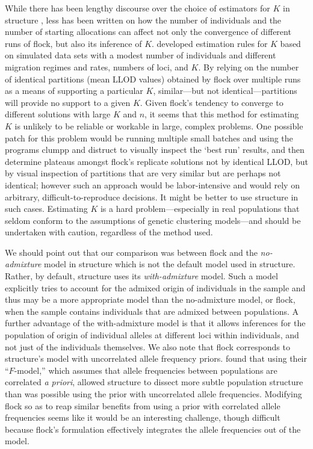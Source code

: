 While there has been lengthy 
discourse over the choice of estimators for $K$ in {\sc structure} 
\citep{Pritchardetal2000,Evannoetal2005,Wap&Gag2006,Gaoetal2011}, less has been written on how the number of 
individuals
and the number of starting allocations can affect not only the convergence of different runs of {\sc flock}, but also its 
inference of $K$. \citeauthor{Duc&Tur2012} developed estimation rules for $K$ based on simulated data 
sets with a modest number of individuals and different migration regimes and rates, numbers of loci, and $K$. 
By relying on the number of identical partitions (mean LLOD values) obtained by {\sc flock} over multiple
runs as a means of supporting 
a particular $K$,  similar---but not identical---partitions
will provide no support to a given $K$. Given {\sc flock}'s tendency to converge to 
different solutions with large $K$ and $n$, it seems that 
this method for estimating $K$ is unlikely to be reliable or workable in large, complex
problems.  One possible patch for this problem would be running
multiple small batches and using the programs {\sc clumpp} \citep{Jak&Ros2007} and
{\sc distruct} \citep{Rosenberg2004} to visually inspect the `best run' results, and then 
determine plateaus amongst {\sc flock}'s replicate solutions not by identical LLOD, but by visual inspection of 
partitions that
are very similar but are perhaps not identical; however such an approach would be labor-intensive
and would rely on arbitrary, difficult-to-reproduce decisions.  It might be better to use {\sc structure} in such cases.
Estimating $K$ is a hard problem---especially in real populations that seldom conform to the assumptions of genetic clustering models---and should be undertaken with caution, regardless of the method 
used. 


We should point out that our comparison was between {\sc flock} and the {\em no-admixture} model in 
{\sc structure} which is not the default model used in {\sc structure}. Rather, by default, {\sc structure} uses 
its {\em with-admixture} model.  Such a model explicitly tries to account for the admixed origin
of individuals in the sample and thus may be a more appropriate model than the no-admixture model,
or {\sc flock}, when the sample contains individuals that are admixed between populations.  A further advantage
of the with-admixture model is that it allows inferences for the population of origin of individual alleles at 
different loci within individuals, and not just of the individuals themselves.   We also note that {\sc flock} 
corresponds to {\sc structure}'s model with uncorrelated allele frequency priors. \citet{Falushetal2003} found that
using their ``$F$-model,'' which assumes that allele frequencies between populations are correlated {\em a priori}, 
allowed {\sc structure} to dissect more subtle population structure than was possible using the prior with
uncorrelated allele frequencies.  Modifying {\sc flock} so as to reap similar benefits from using a prior
with correlated allele frequencies seems like it would be an interesting challenge, though difficult
because {\sc flock}'s formulation effectively integrates the allele frequencies out of the model.
 


